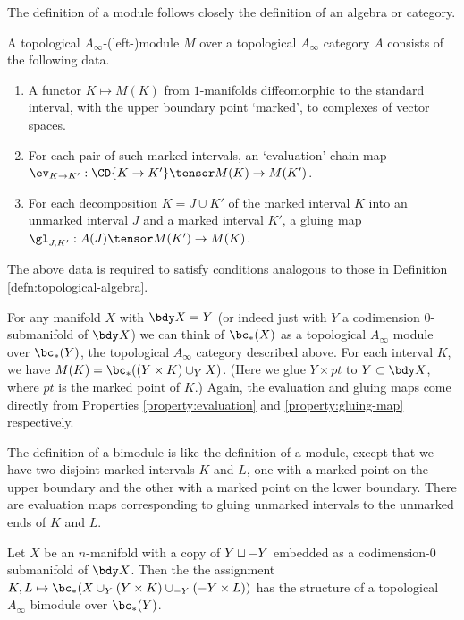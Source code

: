 The definition of a module follows closely the definition of an algebra or category.
\begin{defn}
\label{defn:topological-module}%
A topological $A_\infty$-(left-)module $M$ over a topological $A_\infty$ category $A$
consists of the following data.
\begin{enumerate}
\item A functor $K \mapsto M(K)$ from $1$-manifolds diffeomorphic to the standard interval, with the upper boundary point `marked', to complexes of vector spaces.
\item For each pair of such marked intervals,
an `evaluation' chain map $\ev_{K\to K'} : \CD{K \to K'} \tensor M(K) \to M(K')$.
\item For each decomposition $K = J\cup K'$ of the marked interval
$K$ into an unmarked interval $J$ and a marked interval $K'$, a gluing map
$\gl_{J,K'} : A(J) \tensor M(K') \to M(K)$.
\end{enumerate}
The above data is required to satisfy
conditions analogous to those in Definition \ref{defn:topological-algebra}.
\end{defn}

For any manifold $X$ with $\bdy X = Y$ (or indeed just with $Y$ a codimension $0$-submanifold of $\bdy X$) we can think of $\bc_*(X)$ as
a topological $A_\infty$ module over $\bc_*(Y)$, the topological $A_\infty$ category described above.
For each interval $K$, we have $M(K) = \bc_*((Y \times K) \cup_Y X)$.
(Here we glue $Y \times pt$ to $Y \subset \bdy X$, where $pt$ is the marked point of $K$.) Again, the evaluation and gluing maps come directly from Properties
\ref{property:evaluation} and \ref{property:gluing-map} respectively.

The definition of a bimodule is like the definition of a module,
except that we have two disjoint marked intervals $K$ and $L$, one with a marked point
on the upper boundary and the other with a marked point on the lower boundary.
There are evaluation maps corresponding to gluing unmarked intervals
to the unmarked ends of $K$ and $L$.

Let $X$ be an $n$-manifold with a copy of $Y \sqcup -Y$ embedded as a
codimension-0 submanifold of $\bdy X$.
Then the the assignment $K,L \mapsto \bc_*(X \cup_Y (Y\times K) \cup_{-Y} (-Y\times L))$ has the
structure of a topological $A_\infty$ bimodule over $\bc_*(Y)$.

